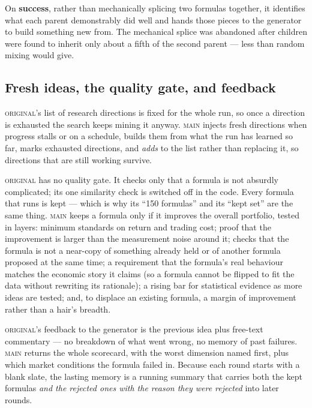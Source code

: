 \documentclass[11pt]{article}
\newcommand{\main}{\textsc{main}}
\newcommand{\orig}{\textsc{original}}
\begin{document}
On \textbf{success}, rather than mechanically splicing two formulas together, it
identifies what each parent demonstrably did well and hands those pieces to the
generator to build something new from. The mechanical splice was abandoned after
children were found to inherit only about a fifth of the second parent --- less than
random mixing would give.

\subsection{Fresh ideas, the quality gate, and feedback}

\orig{}'s list of research directions is fixed for the whole run, so once a direction
is exhausted the search keeps mining it anyway. \main{} injects fresh directions when
progress stalls or on a schedule, builds them from what the run has learned so far,
marks exhausted directions, and \emph{adds} to the list rather than replacing it, so
directions that are still working survive.

\orig{} has no quality gate. It checks only that a formula is not absurdly complicated;
its one similarity check is switched off in the code. Every formula that runs is kept
--- which is why its ``150 formulas'' and its ``kept set'' are the same thing.
\main{} keeps a formula only if it improves the overall portfolio, tested in layers:
minimum standards on return and trading cost; proof that the improvement is larger
than the measurement noise around it; checks that the formula is not a near-copy of
something already held or of another formula proposed at the same time; a requirement
that the formula's real behaviour matches the economic story it claims (so a formula
cannot be flipped to fit the data without rewriting its rationale); a rising bar for
statistical evidence as more ideas are tested; and, to displace an existing formula, a
margin of improvement rather than a hair's breadth.

\orig{}'s feedback to the generator is the previous idea plus free-text commentary ---
no breakdown of what went wrong, no memory of past failures. \main{} returns the whole
scorecard, with the worst dimension named first, plus which market conditions the
formula failed in. Because each round starts with a blank slate, the lasting memory is
a running summary that carries both the kept formulas \emph{and the rejected ones with
the reason they were rejected} into later rounds.
\end{document}
